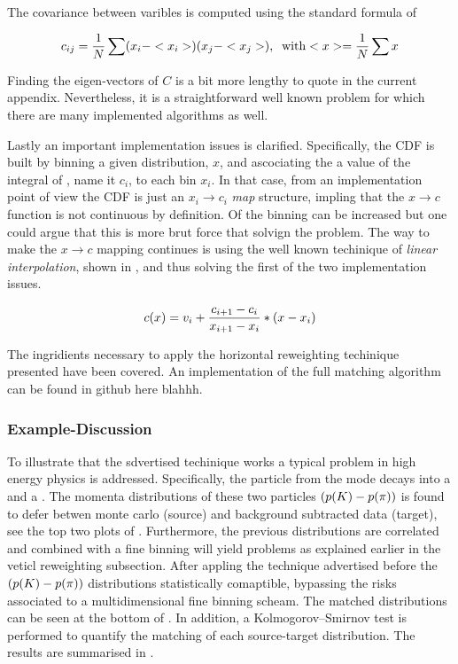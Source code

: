 \noindent The covariance between varibles is computed using the standard formula of 

\begin{equation}
\centering
c_{ij} = \frac{1}{N} \sum (x_i-<x_i>)(x_j-<x_j>), \;\; \text {with} <x> = \frac{1}{N} \sum x \nonumber
\label{hor_reww_correlation_formula}
\end{equation}

\noindent Finding the eigen-vectors of $C$ is a bit more lengthy to quote in the current appendix.
Nevertheless, it is a straightforward well known problem for which there are many implemented
algorithms as well.

Lastly an important implementation issues is clarified. Specifically, the CDF is built by binning a
given distribution, $x$, and ascociating the a value of the integral of , name it $c_i$,
to each bin $x_i$. In that case, from an implementation point of view the CDF is just an $x_i \to c_i$ {\it map}
structure, impling that the $x \to c$ function is not continuous by definition. Of the binning can be increased
but one could argue that this is more brut force that solvign the problem. The way to make the $x \to c$ mapping
continues is using the well known techinique of {\it linear interpolation}, shown in ,
and thus solving the first of the two implementation issues.

\begin{equation}
  c(x) = v_i + \frac{c_{i+1}-c_i}{x_{i+1}-x_i} *  \left( x - x_i \right)
  \label{linear_interpolation}
\end{equation}

The ingridients necessary to apply the horizontal reweighting techinique presented have been covered.
{\color{red}An implementation of the full matching algorithm can be found in github here blahhh}.

\subsubsection{Example-Discussion}
To illustrate that the sdvertised techinique works a typical problem in high energy physics is addressed.
Specifically, the \Kstarz particle from the \BsJpsiKst mode decays into a \kaon and a \pion. The momenta
distributions of these two particles $\left( \mbox{$p$}(K)-\mbox{$p$}(\pi) \right)$ is found to defer betwen
monte carlo (source) and background subtracted data (target), see the top two plots of .
Furthermore, the previous distributions are correlated and combined with a fine binning will yield problems as explained
earlier in the veticl reweighting subsection. After appling the technique advertised before the
$\left( \mbox{$p$}(K)-\mbox{$p$}(\pi) \right)$ distributions statistically comaptible, bypassing the risks associated
to a multidimensional fine binning scheam. The matched distributions can be seen at the bottom of .
In addition, a Kolmogorov–Smirnov test is performed to quantify the matching of each source-target distribution.
The results are summarised in .

